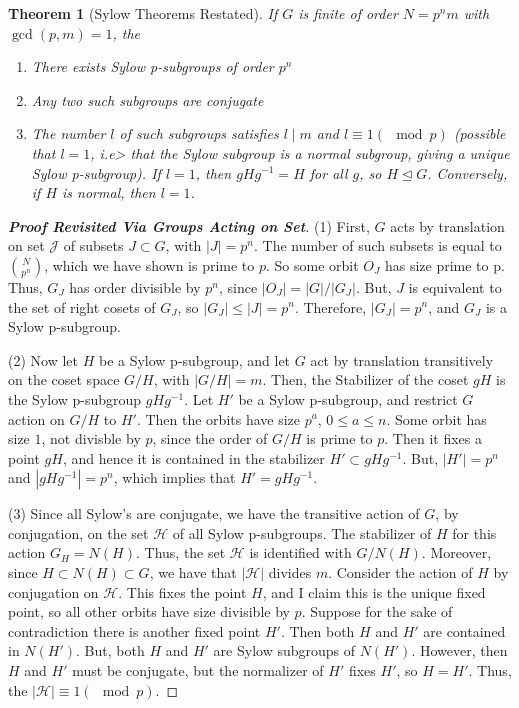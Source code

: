 \documentclass[12pt]{article}
\newtheorem{thm}{Theorem}[section]
\theoremstyle{definition}
\theoremstyle{remark}
\numberwithin{equation}{section}
\newcommand\B[1]{\textbf{ #1}}
\newcommand\nsub{\trianglelefteq}
\begin{document}
\vspace{15pt}

\begin{thm}[Sylow Theorems Restated]
        If $G$ is finite of order $N=p^nm$ with $\gcd(p,m) = 1$, the \begin{enumerate}
                \item There exists Sylow p-subgroups of order $p^n$
                \item Any two such subgroups are conjugate
                \item The number $l$ of such subgroups satisfies $l\;\vert\;m$ and $l \equiv 1 (\mod p)$ (possible that $l = 1$, i.e> that the Sylow subgroup is a normal subgroup, giving a unique Sylow p-subgroup). If $l = 1$, then $gHg^{-1} = H$ for all $g$, so $H \nsub G$. Conversely, if $H$ is normal, then $l = 1$.
        \end{enumerate}
\end{thm}
\begin{proof}
        [\B{Proof Revisited Via Groups Acting on Set}] (1) First, $G$ acts by translation on set $\mathcal{J}$ of subsets $J \subset G$, with $|J| = p^n$. The number of such subsets is equal to $\binom{N}{p^n}$, which we have shown is prime to $p$. So some orbit $O_J$ has size prime to p. Thus, $G_J$ has order divisible by $p^n$, since $|O_J| = |G|/|G_J|$. But, $J$ is equivalent to the set of right cosets of $G_J$, so $|G_J| \leq |J| = p^n$. Therefore, $|G_J| = p^n$, and $G_J$ is a Sylow p-subgroup. 


        (2) Now let $H$ be a Sylow p-subgroup, and let $G$ act by translation transitively on the coset space $G/H$, with $|G/H| = m$. Then, the Stabilizer of the coset $gH$ is the Sylow p-subgroup $gHg^{-1}$. Let $H'$ be a Sylow p-subgroup, and restrict $G$ action on $G/H$ to $H'$. Then the orbits have size $p^a$, $0\leq a \leq n$. Some orbit has size $1$, not divisble by $p$, since the order of $G/H$ is prime to $p$. Then it fixes a point $gH$, and hence it is contained in the stabilizer $H' \subset gHg^{-1}$. But, $|H'| = p^n$ and $|gHg^{-1}| = p^n$, which implies that $H' = gHg^{-1}$.


        (3) Since all Sylow's are conjugate, we have the transitive action of $G$, by conjugation, on the set $\mathcal{H}$ of all Sylow p-subgroups. The stabilizer of $H$ for this action $G_H=N(H)$. Thus, the set $\mathcal{H}$ is identified with $G/N(H)$. Moreover, since $H \subset N(H) \subset G$, we have that $|\mathcal{H}|$ divides $m$. Consider the action of $H$ by conjugation on $\mathcal{H}$. This fixes the point $H$, and I claim this is the unique fixed point, so all other orbits have size divisible by $p$. Suppose for the sake of contradiction there is another fixed point $H'$. Then both $H$ and $H'$ are contained in $N(H')$. But, both $H$ and $H'$ are Sylow subgroups of $N(H')$. However, then $H$ and $H'$ must be conjugate, but the normalizer of $H'$ fixes $H'$, so $H = H'$. Thus, the $|\mathcal{H}| \equiv 1 (\mod p)$.
\end{proof}
\end{document}
